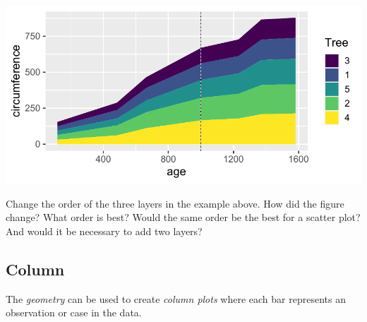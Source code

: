 \documentclass[krantz2]{krantz}\usepackage{knitr}
\begin{document}
\begin{knitrout}\footnotesize
{}\color{fgcolor}\begin{kframe}
\begin{alltt}
\hlstd{(} 
       \hlstd{(}      \hlopt{+}
  \hlstd{(} \hlstd{=} \hlstd{)} \hlopt{+}
  \hlstd{(} \hlstd{=} \hlstd{,}  \hlstd{=} \hlstd{)} \hlopt{+}
  \hlstd{(} \hlstd{=} \hlstd{,}  \hlstd{=} \hlstd{)}
\end{alltt}
\end{kframe}

{\centering \includegraphics[width=.7\textwidth]{figure/pos-area-plot-02-1}

}



\end{knitrout}

\begin{playground}
  Change the order of the three layers in the example above. How did the figure change? What order is best? Would the same order be the best for a scatter plot? And would it be necessary to add two  layers?
\end{playground}

\subsection{Column}\label{sec:plot:col}

The \emph{geometry}  can be used to create \emph{column plots} where each bar represents an observation or case in the data.
\end{document}

